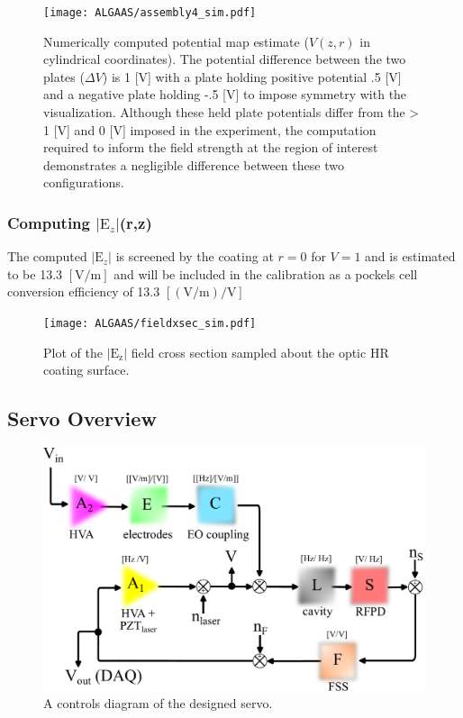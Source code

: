 \begin{figure}[H]
  \centering
  \texttt{[image: ALGAAS/assembly4\_sim.pdf]}
  \caption{Numerically computed potential map estimate ($V(z,r)$ in cylindrical coordinates). The potential difference between the two plates ($\Delta V$) is 1 [V] with a plate holding positive potential .5 [V] and a negative plate holding -.5 [V] to impose symmetry with the visualization. Although these held plate potentials differ from the > 1 [V] and 0 [V] imposed in the experiment, the computation required to inform the field strength at the region of interest demonstrates a negligible difference between these two configurations.} 
  \label{fig:poissoncalcoutput}
\end{figure}


\subsubsection*{Computing $|\mathrm{E}_z|$(r,z)}

The computed $|\mathrm{E}_z|$ is screened by the coating at $r = 0$ for $V = 1$ and is estimated to be 13.3 $[\mathrm{V}/\mathrm{m}]$ and will be included in the calibration as a pockels cell conversion efficiency of 13.3 $[(\mathrm{V} / \mathrm{m}) / \mathrm{V}]$  

\begin{figure}[H]
    \texttt{[image: ALGAAS/fieldxsec\_sim.pdf]}
    \caption{Plot of the $| \mathrm{E}_\mathrm{z} |$ field cross section sampled about the optic HR coating surface.}
\label{fig:Ez}
\end{figure}

\iffalse
\subsection{Servo Overview}
\begin{figure}[!ht]
	\includegraphics[width=\textwidth]{figs/ALGAAS/pock_control_diagram.pdf}
	\caption{A controls diagram of the designed servo.}
	\label{fig:pock_control_servo}
\end{figure}

